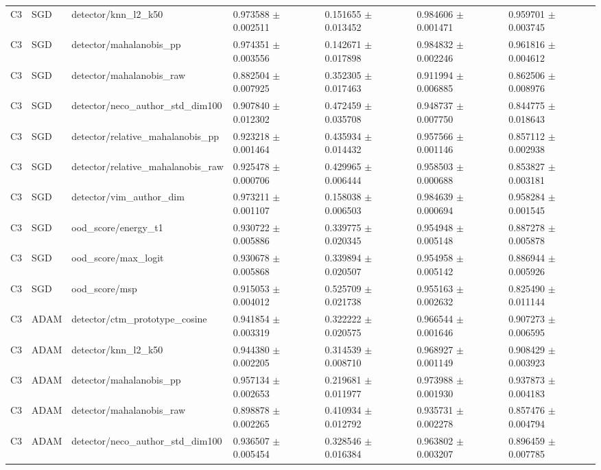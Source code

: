 \begin{longtable}{lllllll}
C3 & SGD & detector/knn\_l2\_k50 & 0.973588 $\pm$ 0.002511 & 0.151655 $\pm$ 0.013452 & 0.984606 $\pm$ 0.001471 & 0.959701 $\pm$ 0.003745 \\
C3 & SGD & detector/mahalanobis\_pp & 0.974351 $\pm$ 0.003556 & 0.142671 $\pm$ 0.017898 & 0.984832 $\pm$ 0.002246 & 0.961816 $\pm$ 0.004612 \\
C3 & SGD & detector/mahalanobis\_raw & 0.882504 $\pm$ 0.007925 & 0.352305 $\pm$ 0.017463 & 0.911994 $\pm$ 0.006885 & 0.862506 $\pm$ 0.008976 \\
C3 & SGD & detector/neco\_author\_std\_dim100 & 0.907840 $\pm$ 0.012302 & 0.472459 $\pm$ 0.035708 & 0.948737 $\pm$ 0.007750 & 0.844775 $\pm$ 0.018643 \\
C3 & SGD & detector/relative\_mahalanobis\_pp & 0.923218 $\pm$ 0.001464 & 0.435934 $\pm$ 0.014432 & 0.957566 $\pm$ 0.001146 & 0.857112 $\pm$ 0.002938 \\
C3 & SGD & detector/relative\_mahalanobis\_raw & 0.925478 $\pm$ 0.000706 & 0.429965 $\pm$ 0.006444 & 0.958503 $\pm$ 0.000688 & 0.853827 $\pm$ 0.003181 \\
C3 & SGD & detector/vim\_author\_dim & 0.973211 $\pm$ 0.001107 & 0.158038 $\pm$ 0.006503 & 0.984639 $\pm$ 0.000694 & 0.958284 $\pm$ 0.001545 \\
C3 & SGD & ood\_score/energy\_t1 & 0.930722 $\pm$ 0.005886 & 0.339775 $\pm$ 0.020345 & 0.954948 $\pm$ 0.005148 & 0.887278 $\pm$ 0.005878 \\
C3 & SGD & ood\_score/max\_logit & 0.930678 $\pm$ 0.005868 & 0.339894 $\pm$ 0.020507 & 0.954958 $\pm$ 0.005142 & 0.886944 $\pm$ 0.005926 \\
C3 & SGD & ood\_score/msp & 0.915053 $\pm$ 0.004012 & 0.525709 $\pm$ 0.021738 & 0.955163 $\pm$ 0.002632 & 0.825490 $\pm$ 0.011144 \\
C3 & ADAM & detector/ctm\_prototype\_cosine & 0.941854 $\pm$ 0.003319 & 0.322222 $\pm$ 0.020575 & 0.966544 $\pm$ 0.001646 & 0.907273 $\pm$ 0.006595 \\
C3 & ADAM & detector/knn\_l2\_k50 & 0.944380 $\pm$ 0.002205 & 0.314539 $\pm$ 0.008710 & 0.968927 $\pm$ 0.001149 & 0.908429 $\pm$ 0.003923 \\
C3 & ADAM & detector/mahalanobis\_pp & 0.957134 $\pm$ 0.002653 & 0.219681 $\pm$ 0.011977 & 0.973988 $\pm$ 0.001930 & 0.937873 $\pm$ 0.004183 \\
C3 & ADAM & detector/mahalanobis\_raw & 0.898878 $\pm$ 0.002265 & 0.410934 $\pm$ 0.012792 & 0.935731 $\pm$ 0.002278 & 0.857476 $\pm$ 0.004794 \\
C3 & ADAM & detector/neco\_author\_std\_dim100 & 0.936507 $\pm$ 0.005454 & 0.328546 $\pm$ 0.016384 & 0.963802 $\pm$ 0.003207 & 0.896459 $\pm$ 0.007785 \\

\end{longtable}
